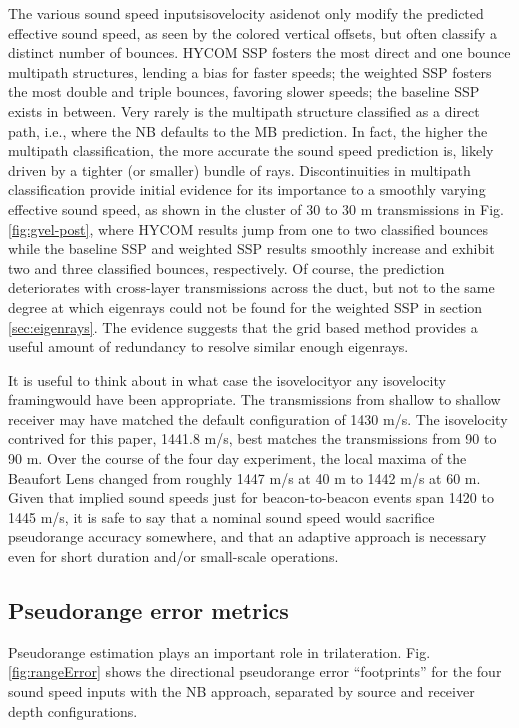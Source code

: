 \documentclass[preprint,TurnOnLineNumbers]{JASA}
\newcommand{\llabel}[1]{\hypertarget{llineno:#1}{\linelabel{#1}}}
\begin{document}
The various sound speed inputs\textemdash isovelocity aside\textemdash not only modify the predicted effective sound speed, as seen by the colored vertical offsets, but often classify a distinct number of bounces.
HYCOM SSP fosters the most direct and one bounce multipath structures, lending a bias for faster speeds; the weighted SSP fosters the most double and triple bounces, favoring slower speeds; the baseline SSP exists in between.
Very rarely is the multipath structure classified as a direct path, i.e., where the NB defaults to the MB prediction.
In fact, the higher the multipath classification, the more accurate the sound speed prediction is, likely driven by a tighter (or smaller) bundle of rays.
\llabel{1.19} Discontinuities in multipath classification provide initial evidence for its importance to a smoothly varying effective sound speed, as shown in the cluster of 30 to 30 m transmissions in Fig. \ref{fig:gvel-post}, where HYCOM results jump from one to two classified bounces while the baseline SSP and weighted SSP results smoothly increase and exhibit two and three classified bounces, respectively.
Of course, the prediction deteriorates with cross-layer transmissions across the duct, but not to the same degree at which eigenrays could not be found for the weighted SSP in section \ref{sec:eigenrays}.
The evidence suggests that the grid based method provides a useful amount of redundancy to resolve similar enough eigenrays.

It is useful to think about in what case the isovelocity\textemdash or any isovelocity framing\textemdash would have been appropriate.
The transmissions from shallow to shallow receiver may have matched the default configuration of 1430 m/s.
The isovelocity contrived for this paper, 1441.8 m/s, best matches the transmissions from 90 to 90 m.
Over the course of the four day experiment, the local maxima of the Beaufort Lens changed from roughly 1447 m/s at 40 m to 1442 m/s at 60 m.
Given that implied sound speeds just for beacon-to-beacon events span 1420 to 1445 m/s, it is safe to say that a nominal sound speed would sacrifice pseudorange accuracy somewhere, and that an adaptive approach is necessary even for short duration and/or small-scale operations.

\subsection{Pseudorange error metrics}

Pseudorange estimation plays an important role in trilateration.
Fig. \ref{fig:rangeError} shows the directional pseudorange error ``footprints'' for the four sound speed inputs with the NB approach, separated by source and receiver depth configurations.
\end{document}
